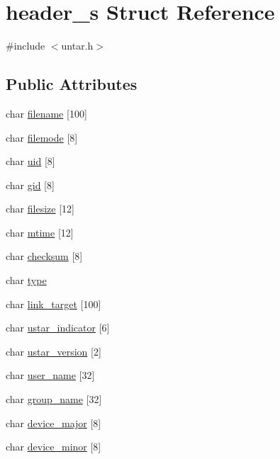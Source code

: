 \hypertarget{structheader__s}{}\section{header\+\_\+s Struct Reference}
\label{structheader__s}


{\ttfamily \#include $<$untar.\+h$>$}

\subsection*{Public Attributes}
\begin{DoxyCompactItemize}
\item 
char \hyperlink{structheader__s_a57477af172d1e808b1d436aad5bd5204}{filename} \mbox{[}100\mbox{]}
\item 
char \hyperlink{structheader__s_abc2d65fbeaa4230f4eeb477b845be8dd}{filemode} \mbox{[}8\mbox{]}
\item 
char \hyperlink{structheader__s_a3f40cec1739fa9b9f87257f70693b072}{uid} \mbox{[}8\mbox{]}
\item 
char \hyperlink{structheader__s_af066cfd50e176b1f5bf9d4277a409ec8}{gid} \mbox{[}8\mbox{]}
\item 
char \hyperlink{structheader__s_ace8004abf8b595917d96a126c35ef7f7}{filesize} \mbox{[}12\mbox{]}
\item 
char \hyperlink{structheader__s_aa14d1f976fe922aa00b8cbc28776d75c}{mtime} \mbox{[}12\mbox{]}
\item 
char \hyperlink{structheader__s_a341daffac132934a1fdeb3fce5342458}{checksum} \mbox{[}8\mbox{]}
\item 
char \hyperlink{structheader__s_ac4ef9d8ca794a4f8fd27ebcb6f3f30cc}{type}
\item 
char \hyperlink{structheader__s_a1b63d7e7e146f010efaf0366e9eb4bb6}{link\+\_\+target} \mbox{[}100\mbox{]}
\item 
char \hyperlink{structheader__s_a02dbb164bc5f5b2ddb2ecd0a695ecea4}{ustar\+\_\+indicator} \mbox{[}6\mbox{]}
\item 
char \hyperlink{structheader__s_a9ef115903a0ea3583f1993f6ab00113b}{ustar\+\_\+version} \mbox{[}2\mbox{]}
\item 
char \hyperlink{structheader__s_a4c3170954261e29acd3af7efbe9070c6}{user\+\_\+name} \mbox{[}32\mbox{]}
\item 
char \hyperlink{structheader__s_a5da4190bb147496e7e8e4f4d7753fbbf}{group\+\_\+name} \mbox{[}32\mbox{]}
\item 
char \hyperlink{structheader__s_abfe398916a44132a50218ebc419a310c}{device\+\_\+major} \mbox{[}8\mbox{]}
\item 
char \hyperlink{structheader__s_a52799a500bdbebdbcb38d8636dae5143}{device\+\_\+minor} \mbox{[}8\mbox{]}
\end{DoxyCompactItemize}


